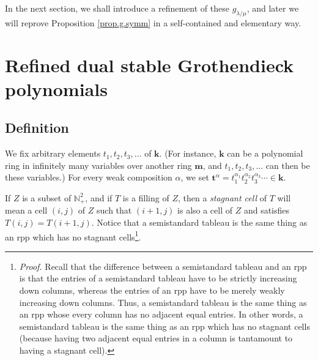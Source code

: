 \documentclass[numbers=enddot,12pt,final,onecolumn,notitlepage]{scrartcl}%
\theoremstyle{definition}
\newenvironment{vershort}{}{}
\begin{document}
In the next section, we shall introduce a refinement of these $g_{\lambda/\mu
}$, and later we will reprove Proposition \ref{prop.g.symm} in a
self-contained and elementary way.

\section{\label{sect.def}Refined dual stable Grothendieck polynomials}

\subsection{Definition}

We fix arbitrary elements $t_{1},t_{2},t_{3},\ldots$ of $\mathbf{k}$. (For
instance, $\mathbf{k}$ can be a polynomial ring in infinitely many variables
over another ring $\mathbf{m}$, and $t_{1},t_{2},t_{3},\ldots$ can then be
these variables.) For every weak composition $\alpha$, we set $\mathbf{t}%
^{\alpha}=t_{1}^{\alpha_{1}}t_{2}^{\alpha_{2}}t_{3}^{\alpha_{3}}\cdots
\in\mathbf{k}$.

\begin{vershort}
If $Z$ is a subset of $\mathbb{N}_{+}^{2}$, and if $T$ is a filling of $Z$,
then a \textit{stagnant cell} of $T$ will mean a cell $\left(  i,j\right)  $
of $Z$ such that $\left(  i+1,j\right)  $ is also a cell of $Z$ and satisfies
$T\left(  i,j\right)  =T\left(  i+1,j\right)  $. Notice that a semistandard
tableau is the same thing as an rpp which has no stagnant
cells\footnote{\textit{Proof.} Recall that the difference between a
semistandard tableau and an rpp is that the entries of a semistandard tableau
have to be strictly increasing down columns, whereas the entries of an rpp
have to be merely weakly increasing down columns. Thus, a semistandard tableau
is the same thing as an rpp whose every column has no adjacent equal entries.
In other words, a semistandard tableau is the same thing as an rpp which has
no stagnant cells (because having two adjacent equal entries in a column is
tantamount to having a stagnant cell).}.
\end{vershort}
\end{document}
